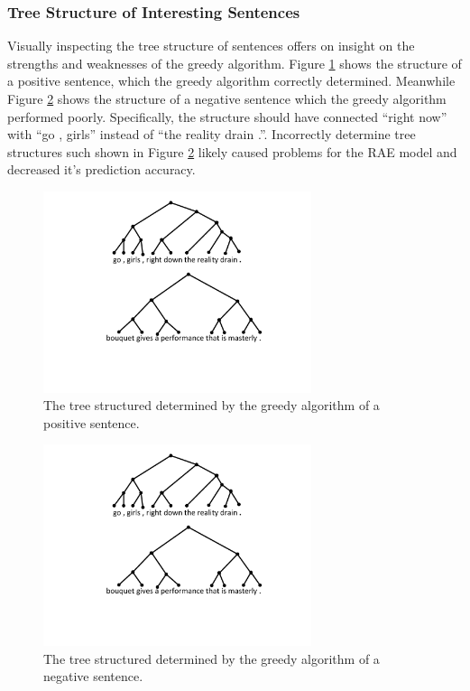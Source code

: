 \documentclass{article}
\begin{document}
\subsubsection{Tree Structure of Interesting Sentences}
Visually inspecting the tree structure of sentences offers on insight on the strengths and weaknesses of the greedy algorithm. Figure \ref{fig:tree_positive} shows the structure of a positive sentence, which the greedy algorithm correctly determined. Meanwhile Figure \ref{fig:tree_negative} shows the structure of a negative sentence which the greedy algorithm performed poorly. Specifically, the structure should have connected ``right now'' with ``go , girls'' instead of ``the reality drain .''. Incorrectly determine tree structures such shown in Figure \ref{fig:tree_negative} likely caused problems for the RAE model and decreased it's prediction accuracy.


\begin{figure}[h]
\begin{center}
    \includegraphics[width=0.7\textwidth]{tree_positive}
    \caption{The tree structured determined by the greedy algorithm of a positive sentence.}
    \label{fig:tree_positive}
\end{center}
\end{figure}


\begin{figure}[h]
\begin{center}
    \includegraphics[width=0.7\textwidth]{tree_positive}
    \caption{The tree structured determined by the greedy algorithm of a negative sentence.}
    \label{fig:tree_negative}
\end{center}
\end{figure}
\end{document}
